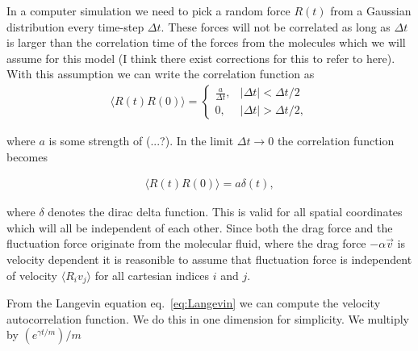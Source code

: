 In a computer simulation we need to pick a random force $R(t)$ from a Gaussian distribution every time-step $\Delta t$. These forces will not be correlated as long as $\Delta t$ is larger than the correlation time of the forces from the molecules which we will assume for this model (I think there exist corrections for this to refer to here). With this assumption we can write the correlation function as 
\begin{align*}
  \langle R(t) R(0) \rangle = 
  \begin{cases}
    \frac{a}{\Delta t}, & |\Delta t| < \Delta t/2 \\
    0, & |\Delta t| > \Delta t/2,
  \end{cases}
\end{align*}

where $a$ is some strength of (...?). In the limit $\Delta t \to 0$ the correlation function becomes

\begin{align}
  \langle R(t)R(0) \rangle = a \delta(t),
  \label{eq:F_corr}
\end{align}

where $\delta$ denotes the dirac delta function. This is valid for all spatial coordinates which will all be independent of each other. Since both the drag force and the fluctuation force originate from the molecular fluid, where the drag force $-\alpha \vec{v}$ is velocity dependent it is reasonible to assume that fluctuation force is independent of velocity $\langle R_i v_j \rangle$ for all cartesian indices $i$ and $j$.






From the Langevin equation eq.~\eqref{eq:Langevin} we can compute the velocity autocorrelation function. We do this in one dimension for simplicity. We multiply by $(e^{\gamma t /m})/m$

